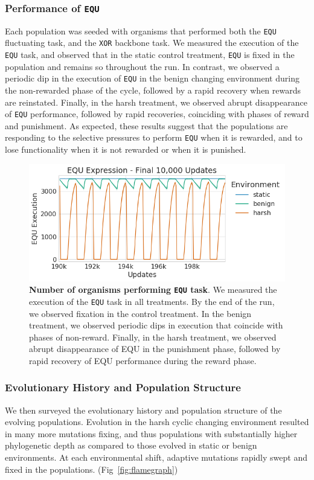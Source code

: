 \documentclass[PhD]{msu-thesis}
\begin{document}
\subsubsection{Performance of \texttt{EQU}}
Each population was seeded with organisms that performed both the \texttt{EQU} fluctuating task, and the \texttt{XOR} backbone task. We measured the execution of the \texttt{EQU} task, and observed that in the static control treatment, \texttt{EQU} is fixed in the population and remains so throughout the run. In contrast, we observed a periodic dip in the execution of \texttt{EQU} in the benign changing environment during the non-rewarded phase of the cycle, followed by a rapid recovery when rewards are reinstated. Finally, in the harsh treatment, we observed abrupt disappearance of \texttt{EQU} performance, followed by rapid recoveries, coinciding with phases of reward and punishment. As expected, these results suggest that the populations are responding to the selective pressures to perform \texttt{EQU} when it is rewarded, and to lose functionality when it is not rewarded or when it is punished.

	\begin{figure}[!h]
	\includegraphics[width=0.75\columnwidth]{figures/CE/CCE_equ_execution.png}
	\caption{\textbf{Number of organisms performing \texttt{EQU} task}. We measured the execution of the \texttt{EQU} task in all treatments. By the end of the run, we observed fixation in the control treatment. In the benign treatment, we observed periodic dips in execution that coincide with phases of non-reward. Finally, in the harsh treatment, we observed abrupt disappearance of EQU in the punishment phase, followed by rapid recovery of EQU performance during the reward phase.
	}
	\label{fig:CCE_equ_execution} %
	\end{figure}

\subsubsection{Evolutionary History and Population Structure}
We then surveyed the evolutionary history and population structure of the evolving populations. Evolution in the harsh cyclic changing environment resulted in many more mutations fixing, and thus populations with substantially higher phylogenetic depth as compared to those evolved in static or benign environments. At each environmental shift, adaptive mutations rapidly swept and fixed in the populations. (Fig~\ref{fig:flamegraph})
\end{document}
